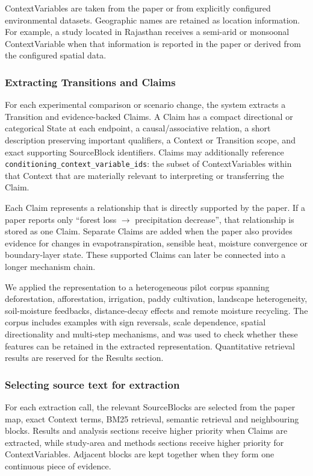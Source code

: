\documentclass[10pt,twocolumn]{article}
\begin{document}
ContextVariables are taken from the paper or from explicitly configured environmental datasets. Geographic names are retained as location information. For example, a study located in Rajasthan receives a semi-arid or monsoonal ContextVariable when that information is reported in the paper or derived from the configured spatial data.

\subsubsection{Extracting Transitions and Claims}

For each experimental comparison or scenario change, the system extracts a Transition and evidence-backed Claims. A Claim has a compact directional or categorical State at each endpoint, a causal/associative relation, a short description preserving important qualifiers, a Context or Transition scope, and exact supporting SourceBlock identifiers. Claims may additionally reference \texttt{conditioning\_context\_variable\_ids}: the subset of ContextVariables within that Context that are materially relevant to interpreting or transferring the Claim.

Each Claim represents a relationship that is directly supported by the paper. If a paper reports only ``forest loss $\rightarrow$ precipitation decrease'', that relationship is stored as one Claim. Separate Claims are added when the paper also provides evidence for changes in evapotranspiration, sensible heat, moisture convergence or boundary-layer state. These supported Claims can later be connected into a longer mechanism chain.

We applied the representation to a heterogeneous pilot corpus spanning deforestation, afforestation, irrigation, paddy cultivation, landscape heterogeneity, soil-moisture feedbacks, distance-decay effects and remote moisture recycling. The corpus includes examples with sign reversals, scale dependence, spatial directionality and multi-step mechanisms, and was used to check whether these features can be retained in the extracted representation. Quantitative retrieval results are reserved for the Results section.

\subsubsection{Selecting source text for extraction}

For each extraction call, the relevant SourceBlocks are selected from the paper map, exact Context terms, BM25 retrieval, semantic retrieval and neighbouring blocks. Results and analysis sections receive higher priority when Claims are extracted, while study-area and methods sections receive higher priority for ContextVariables. Adjacent blocks are kept together when they form one continuous piece of evidence.
\end{document}
